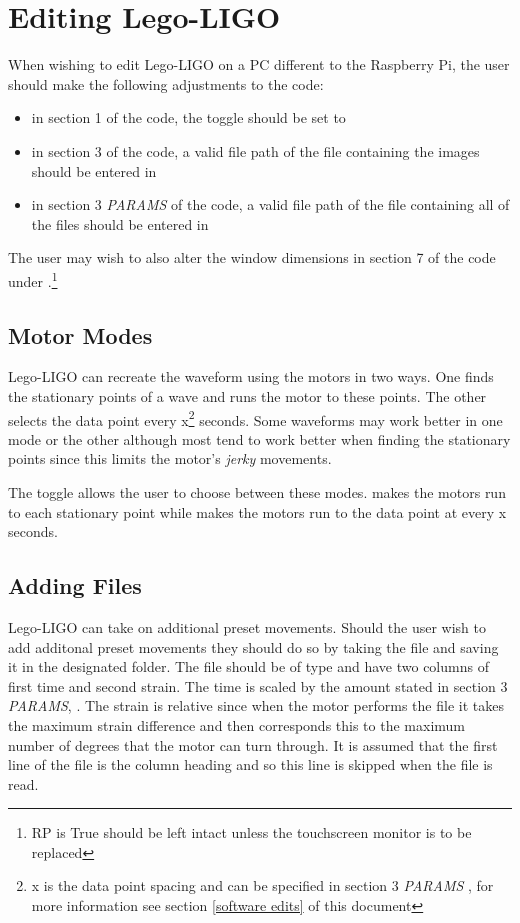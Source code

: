 \documentclass[a4paper, 12pt]{book}
\begin{document}
\chapter{Editing Lego-LIGO}
When wishing to edit Lego-LIGO on a PC different to the Raspberry Pi, the user should make the following adjustments to the code:
\begin{itemize}
\item in section 1 of the code, the  toggle should be set to 
\item in section 3 of the code, a valid file path of the file containing the images should be entered in 
\item in section 3 \textit{PARAMS} of the code, a valid file path of the  file containing all of the  files should be entered in 
\end{itemize}
The user may wish to also alter the window dimensions in section 7 of the code under .\footnote{\label{RP monitor change}RP is True should be left intact unless the touchscreen monitor is to be replaced}

\section{Motor Modes}
\label{Motor Modes}
Lego-LIGO can recreate the waveform using the motors in two ways. One finds the stationary points of a wave and runs the motor to these points. The other selects the data point every x\footnote{\label{data point spacing}x is the data point spacing and can be specified in section 3 \textit{PARAMS} , for more information see section \ref{software edits} of this document} seconds. Some waveforms may work better in one mode or the other although most tend to work better when finding the stationary points since this limits the motor's \textit{jerky} movements.

The  toggle allows the user to choose between these modes.  makes the motors run to each stationary point while  makes the motors run to the data point at every x seconds.


\section{Adding Files}
\label{Adding files}
Lego-LIGO can take on additional preset movements. Should the user wish to add additonal preset movements they should do so by taking the file and saving it in the designated  folder. The file should be of  type and have two columns of first time and second strain. The time is scaled by the amount stated in section 3 \textit{PARAMS}, . The strain is relative since when the motor performs the file it takes the maximum strain difference and then corresponds this to the maximum number of degrees that the motor can turn through. It is assumed that the first line of the file is the column heading and so this line is skipped when the file is read.
\end{document}
